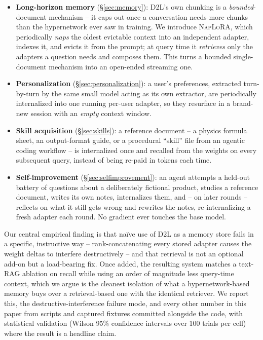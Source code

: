 \documentclass[11pt]{article}
\newcommand{\DTL}{D2L}
\newcommand{\naplora}{\textsc{NapLoRA}}
\begin{document}
\begin{itemize}[leftmargin=*,nosep]
  \item \textbf{Long-horizon memory} (\S\ref{sec:memory}): \DTL{}'s own chunking is a \emph{bounded}-document mechanism -- it caps out once a conversation needs more chunks than the hypernetwork ever saw in training. We introduce \naplora{}, which periodically \emph{naps} the oldest evictable context into an independent adapter, indexes it, and evicts it from the prompt; at query time it \emph{retrieves} only the adapters a question needs and composes them. This turns a bounded single-document mechanism into an open-ended streaming one.
  \item \textbf{Personalization} (\S\ref{sec:personalization}): a user's preferences, extracted turn-by-turn by the same small model acting as its own extractor, are periodically internalized into one running per-user adapter, so they resurface in a brand-new session with an \emph{empty} context window.
  \item \textbf{Skill acquisition} (\S\ref{sec:skills}): a reference document -- a physics formula sheet, an output-format guide, or a procedural ``skill'' file from an agentic coding workflow -- is internalized once and recalled from the weights on every subsequent query, instead of being re-paid in tokens each time.
  \item \textbf{Self-improvement} (\S\ref{sec:selfimprovement}): an agent attempts a held-out battery of questions about a deliberately fictional product, studies a reference document, writes its own notes, internalizes them, and -- on later rounds -- reflects on what it still gets wrong and rewrites the notes, re-internalizing a fresh adapter each round. No gradient ever touches the base model.
\end{itemize}

Our central empirical finding is that na\"ive use of \DTL{} as a memory store fails in a specific, instructive way -- rank-concatenating every stored adapter causes the weight deltas to interfere destructively -- and that retrieval is not an optional add-on but a load-bearing fix. Once added, the resulting system matches a text-RAG ablation on recall while using an order of magnitude less query-time context, which we argue is the cleanest isolation of what a hypernetwork-based memory buys over a retrieval-based one with the identical retriever. We report this, the destructive-interference failure mode, and every other number in this paper from scripts and captured fixtures committed alongside the code, with statistical validation (Wilson 95\% confidence intervals over 100 trials per cell) where the result is a headline claim.
\end{document}
